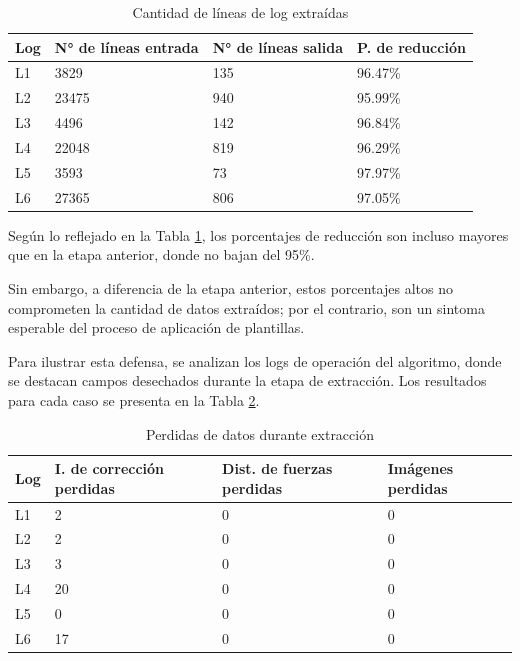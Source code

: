 \begin{table}[h]
    \centering
    \caption{\label{table:etapa2c2} Cantidad de líneas de log extraídas}
    \begin{tabular}{|p{3.5cm}|p{3.5cm}|p{3.5cm}|p{3.5cm}|}
        \hline
        Log & N° de líneas entrada & N° de líneas salida & P. de reducción \\
        \hline
        L1 & 3829 & 135 & 96.47\% \\
        \hline
        L2 & 23475 & 940 & 95.99\% \\
        \hline
        L3 & 4496 & 142 & 96.84\% \\
        \hline
        L4 & 22048 & 819 & 96.29\% \\
        \hline
        L5 & 3593 & 73 & 97.97\% \\
        \hline
        L6 & 27365 & 806 & 97.05\% \\
        \hline
    \end{tabular}
\end{table}


Según lo reflejado en la Tabla \ref{table:etapa2c2}, los porcentajes de reducción son incluso mayores que en la etapa anterior, donde no bajan del 95\%.

Sin embargo, a diferencia de la etapa anterior, estos porcentajes altos no comprometen la cantidad de datos extraídos; por el contrario, son un sintoma esperable del proceso de aplicación de plantillas.

Para ilustrar esta defensa, se analizan los logs de operación del algoritmo, donde se destacan campos desechados durante la etapa de extracción. Los resultados para cada caso se presenta en la Tabla \ref{table:etapa2c3}.


\begin{table}[h]
    \centering
    \caption{\label{table:etapa2c3} Perdidas de datos durante extracción}
    \begin{tabular}{|p{3.5cm}|p{3.5cm}|p{3.5cm}|p{3.5cm}|}
        \hline
        Log & I. de corrección perdidas & Dist. de fuerzas perdidas & Imágenes perdidas \\
        \hline
        L1 & 2 & 0 & 0 \\
        \hline
        L2 & 2 & 0 & 0 \\
        \hline
        L3 & 3 & 0 & 0 \\
        \hline
        L4 & 20 & 0 & 0 \\
        \hline
        L5 & 0 & 0 & 0 \\
        \hline
        L6 & 17 & 0 & 0 \\
        \hline
    \end{tabular}
\end{table}

